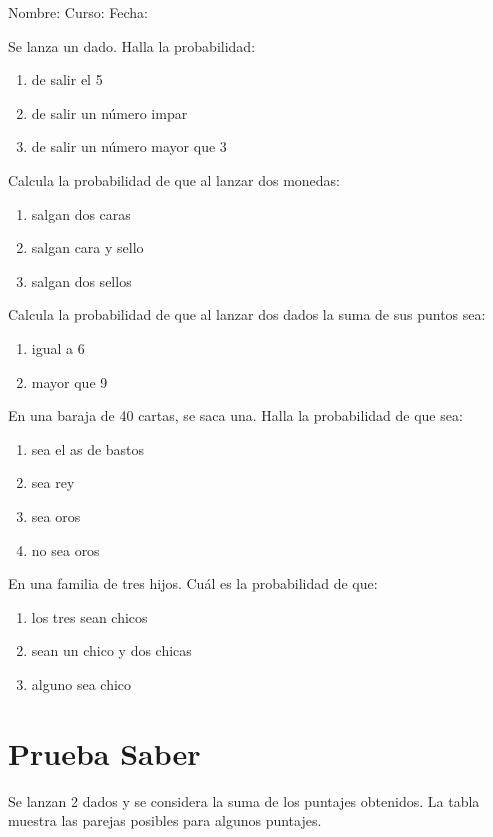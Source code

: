 \documentclass[letterpaper,fleqn]{article}
\newcommand{\LineaNombre}{%
\par
\vspace{\baselineskip}
Nombre:\hrulefill \; Curso: \underline{\hspace*{48pt}} \; Fecha: \underline{\hspace*{2.5cm}} \relax
\par}
\begin{document}
\LineaNombre
\begin{enumerate}
 \item Se lanza un dado. Halla la probabilidad:
 \begin{enumerate}
 \item de salir el 5 \noanswer
 \item de salir un número impar \noanswer
 \item de salir un número mayor que 3 \noanswer
 \end{enumerate}
 \item Calcula la probabilidad de que al lanzar dos monedas:
 \begin{enumerate}
 \item salgan dos caras \noanswer
 \item salgan cara y sello \noanswer 
 \item salgan dos sellos \noanswer
 \end{enumerate}
 \item Calcula la probabilidad de que al lanzar dos dados la suma de sus puntos sea:
 \begin{enumerate}
 \item igual a 6\noanswer 
 \item mayor que 9 \noanswer
 \end{enumerate}
 \item En una baraja de 40 cartas, se saca una. Halla la probabilidad de que sea:
 \begin{enumerate}
 \item sea el as de bastos  \noanswer
 \item sea rey \noanswer 
 \item sea oros
 \item no sea oros \noanswer
 \end{enumerate}
 \item En una familia de tres hijos. Cuál es la probabilidad de que:
 \begin{enumerate}
 \item los tres sean chicos \noanswer 
 \item sean un chico y dos chicas \noanswer 
 \item alguno sea chico \noanswer
 \end{enumerate}
 \section*{Prueba Saber}
 \begin{minipage}{.35\textwidth}
\item Se lanzan 2 dados y se considera la suma de los puntajes obtenidos. La tabla muestra las parejas posibles para algunos puntajes.  \\


\end{minipage}
\end{enumerate}
\end{document}
